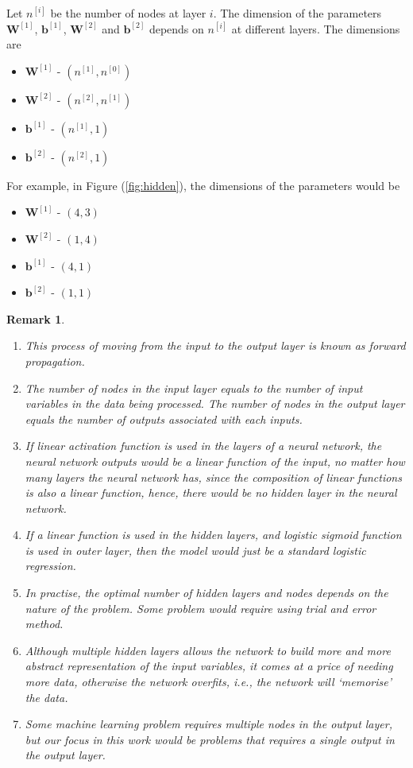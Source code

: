 \documentclass[12pt]{report}
\newtheorem{rem}{Remark}[]
\numberwithin{equation}{section}
\begin{document}
Let $n^{[i]}$ be the number of nodes at layer $i$. The dimension of the parameters $\bm{W}^{[1]}$, $\bm{b}^{[1]}$, $\bm{W}^{[2]}$ and $\bm{b}^{[2]}$ depends on $n^{[i]}$ at different layers. The dimensions are 
\begin{multicols}{2}
\begin{itemize}[label=-]
\item $\bm{W}^{[1]}$ - $(n^{[1]},n^{[0]})$
\item $\bm{W}^{[2]}$ - $(n^{[2]},n^{[1]})$
\item $\bm{b}^{[1]}$ - $(n^{[1]},1)$
\item $\bm{b}^{[2]}$ - $(n^{[2]},1)$
\end{itemize}
\end{multicols}
\noindent For example, in Figure (\ref{fig:hidden}), the dimensions of the parameters would be
\begin{multicols}{2}
\begin{itemize}[label=-]
\item $\bm{W}^{[1]}$ - $(4,3)$
\item $\bm{W}^{[2]}$ - $(1,4)$
\item $\bm{b}^{[1]}$ - $(4,1)$
\item $\bm{b}^{[2]}$ - $(1,1)$
\end{itemize}
\end{multicols}
\begin{rem}
\normalfont 
\begin{enumerate}
\item This process of moving from the input to the output layer is known as \textit{forward propagation}.
\item The number of nodes in the input layer equals to the number of input variables in the data being processed. The number of nodes in the output layer equals the number of outputs associated with each inputs. 
\item If linear activation function is used in the layers of a neural network, the neural network outputs would be a linear function of the input, no matter how many layers the neural network has, since the composition of linear functions is also a linear function, hence, there would be no hidden layer in the neural network.
\item If a linear function is used in the hidden layers, and logistic sigmoid function is used in outer layer, then the model would just be a standard logistic regression.
\item In practise, the optimal number of hidden layers and nodes depends on the nature of the problem. Some problem would require using trial and error method.
\item Although multiple hidden layers allows the network to build more and more abstract representation of the input variables, it comes at a price of needing more data, otherwise the network overfits, i.e., the network will `memorise' the data.
\item Some machine learning problem requires multiple nodes in the output layer, but our focus in this work would be problems that requires a single output in the output layer.
\end{enumerate}
\end{rem}
\end{document}
